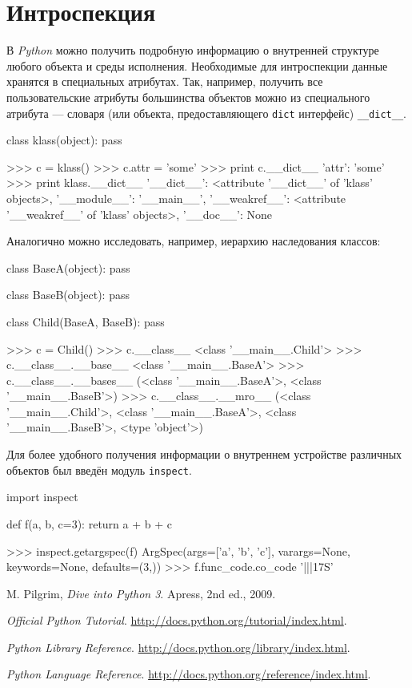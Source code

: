 \section{Интроспекция}
\label{sec:py-introspection}

В \emph{Python} можно получить подробную информацию о внутренней структуре любого объекта и среды исполнения. Необходимые для интроспекции данные хранятся в специальных атрибутах. Так, например, получить все пользовательские атрибуты большинства объектов можно из специального атрибута — словаря (или объекта, предоставляющего \lstinline{dict} интерфейс) \lstinline{__dict__}.
\begin{pylst}{}{}
class klass(object):
    pass

>>> c = klass()
>>> c.attr = 'some'
>>> print c.__dict__
{'attr': 'some'}
>>> print klass.__dict__
{'__dict__': <attribute '__dict__' of 'klass' objects>,
 '__module__': '__main__',
 '__weakref__': <attribute '__weakref__' of 'klass' objects>,
 '__doc__': None}
\end{pylst}

Аналогично можно исследовать, например, иерархию наследования классов:
\begin{pylst}{}{}
class BaseA(object):
    pass

class BaseB(object):
    pass

class Child(BaseA, BaseB):
    pass

>>> c = Child()
>>> c.__class__
<class '__main__.Child'>
>>> c.__class__.__base__
<class '__main__.BaseA'>
>>> c.__class__.__bases__
(<class '__main__.BaseA'>, <class '__main__.BaseB'>)
>>> c.__class__.__mro__
(<class '__main__.Child'>,
 <class '__main__.BaseA'>,
 <class '__main__.BaseB'>,
 <type 'object'>)
\end{pylst}

Для более удобного получения информации о внутреннем устройстве различных объектов был введён модуль \lstinline{inspect}.
\begin{pylst}{}{}
import inspect

def f(a, b, c=3):
    return a + b + c

>>> inspect.getargspec(f)
ArgSpec(args=['a', 'b', 'c'], varargs=None, keywords=None, defaults=(3,))
>>> f.func_code.co_code
'|||\x17S'
\end{pylst}

\begin{thebibliography}{9}

  M. Pilgrim,
  \emph{Dive into Python 3}.
  Apress,
  2nd ed.,
  2009.

  \emph{Official Python Tutorial}.
  \url{http://docs.python.org/tutorial/index.html}.

  \emph{Python Library Reference}.
  \url{http://docs.python.org/library/index.html}.

  \emph{Python Language Reference}.
  \url{http://docs.python.org/reference/index.html}.

\end{thebibliography}
